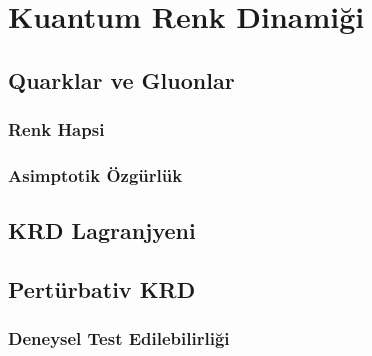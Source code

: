\chapter{Kuantum Renk Dinamiği}
\section{Quarklar ve Gluonlar}
\lipsum[2-3]
\subsection{Renk Hapsi}
\lipsum[2-3]
\subsection{Asimptotik Özgürlük}
\lipsum[2-3]
\section{KRD Lagranjyeni}
\lipsum[2-3]
\section{Pertürbativ KRD}
\lipsum[2-3]
\subsection{Deneysel Test Edilebilirliği}
\lipsum[2-3]